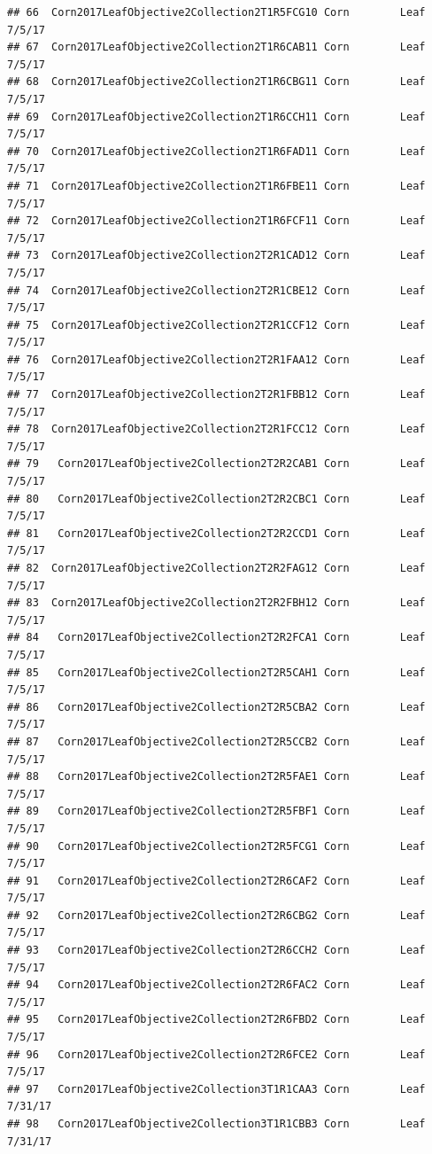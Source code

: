 \documentclass[
]{article}
\begin{document}
\begin{verbatim}
## 66  Corn2017LeafObjective2Collection2T1R5FCG10 Corn        Leaf      7/5/17
## 67  Corn2017LeafObjective2Collection2T1R6CAB11 Corn        Leaf      7/5/17
## 68  Corn2017LeafObjective2Collection2T1R6CBG11 Corn        Leaf      7/5/17
## 69  Corn2017LeafObjective2Collection2T1R6CCH11 Corn        Leaf      7/5/17
## 70  Corn2017LeafObjective2Collection2T1R6FAD11 Corn        Leaf      7/5/17
## 71  Corn2017LeafObjective2Collection2T1R6FBE11 Corn        Leaf      7/5/17
## 72  Corn2017LeafObjective2Collection2T1R6FCF11 Corn        Leaf      7/5/17
## 73  Corn2017LeafObjective2Collection2T2R1CAD12 Corn        Leaf      7/5/17
## 74  Corn2017LeafObjective2Collection2T2R1CBE12 Corn        Leaf      7/5/17
## 75  Corn2017LeafObjective2Collection2T2R1CCF12 Corn        Leaf      7/5/17
## 76  Corn2017LeafObjective2Collection2T2R1FAA12 Corn        Leaf      7/5/17
## 77  Corn2017LeafObjective2Collection2T2R1FBB12 Corn        Leaf      7/5/17
## 78  Corn2017LeafObjective2Collection2T2R1FCC12 Corn        Leaf      7/5/17
## 79   Corn2017LeafObjective2Collection2T2R2CAB1 Corn        Leaf      7/5/17
## 80   Corn2017LeafObjective2Collection2T2R2CBC1 Corn        Leaf      7/5/17
## 81   Corn2017LeafObjective2Collection2T2R2CCD1 Corn        Leaf      7/5/17
## 82  Corn2017LeafObjective2Collection2T2R2FAG12 Corn        Leaf      7/5/17
## 83  Corn2017LeafObjective2Collection2T2R2FBH12 Corn        Leaf      7/5/17
## 84   Corn2017LeafObjective2Collection2T2R2FCA1 Corn        Leaf      7/5/17
## 85   Corn2017LeafObjective2Collection2T2R5CAH1 Corn        Leaf      7/5/17
## 86   Corn2017LeafObjective2Collection2T2R5CBA2 Corn        Leaf      7/5/17
## 87   Corn2017LeafObjective2Collection2T2R5CCB2 Corn        Leaf      7/5/17
## 88   Corn2017LeafObjective2Collection2T2R5FAE1 Corn        Leaf      7/5/17
## 89   Corn2017LeafObjective2Collection2T2R5FBF1 Corn        Leaf      7/5/17
## 90   Corn2017LeafObjective2Collection2T2R5FCG1 Corn        Leaf      7/5/17
## 91   Corn2017LeafObjective2Collection2T2R6CAF2 Corn        Leaf      7/5/17
## 92   Corn2017LeafObjective2Collection2T2R6CBG2 Corn        Leaf      7/5/17
## 93   Corn2017LeafObjective2Collection2T2R6CCH2 Corn        Leaf      7/5/17
## 94   Corn2017LeafObjective2Collection2T2R6FAC2 Corn        Leaf      7/5/17
## 95   Corn2017LeafObjective2Collection2T2R6FBD2 Corn        Leaf      7/5/17
## 96   Corn2017LeafObjective2Collection2T2R6FCE2 Corn        Leaf      7/5/17
## 97   Corn2017LeafObjective2Collection3T1R1CAA3 Corn        Leaf     7/31/17
## 98   Corn2017LeafObjective2Collection3T1R1CBB3 Corn        Leaf     7/31/17

\end{verbatim}
\end{document}
